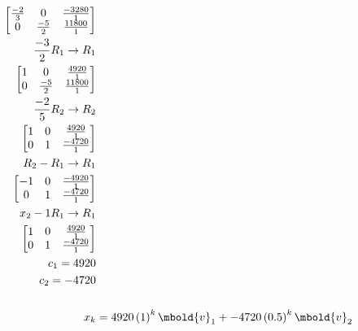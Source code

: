 \documentclass[12pt letter]{report}
\begin{document}
{\begin{align*}
    \begin{bmatrix}
      \frac{-2}{3} & 0            & \frac{-3280}{1} \\
      0            & \frac{-5}{2} & \frac{11800}{1} \\
    \end{bmatrix}
    \\
    \frac{-3}{2}R_1 \to R_1                                                                \\
    \begin{bmatrix}
      1 & 0            & \frac{4920}{1}  \\
      0 & \frac{-5}{2} & \frac{11800}{1} \\
    \end{bmatrix}
    \\
    \frac{-2}{5}R_2 \to R_2                                                                \\
    \begin{bmatrix}
      1 & 0 & \frac{4920}{1}  \\
      0 & 1 & \frac{-4720}{1} \\
    \end{bmatrix}
    \\
    R_2 - R_1  \rightarrow R_1                                                             \\
    \begin{bmatrix}
      -1 & 0 & \frac{-4920}{1} \\
      0  & 1 & \frac{-4720}{1} \\
    \end{bmatrix}
    \\
    x_2   -1R_1 \to R_1                                                                    \\
    \begin{bmatrix}
      1 & 0 & \frac{4920}{1}  \\
      0 & 1 & \frac{-4720}{1} \\
    \end{bmatrix}                                                                \\
    c_1 = 4920                                                                             \\
    c_2 = -4720                                                                            \\
    \\
    x_k & = 4920 \left( 1 \right)^{k}\mbold{v}_1 + -4720 \left( 0.5 \right)^{k}\mbold{v}_2 \\
  \end{align*}



}
\end{document}
